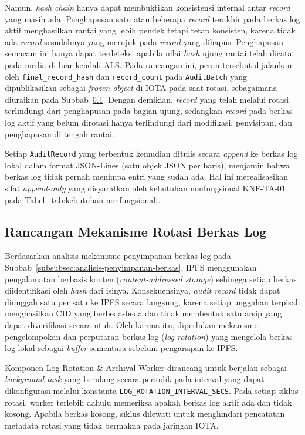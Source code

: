 Namun, \textit{hash chain} hanya dapat membuktikan konsistensi internal antar
\textit{record} yang masih ada. Penghapusan satu atau beberapa \textit{record}
terakhir pada berkas log aktif menghasilkan rantai yang lebih pendek tetapi
tetap konsisten, karena tidak ada \textit{record} sesudahnya yang merujuk pada
\textit{record} yang dihapus. Penghapusan semacam ini hanya dapat terdeteksi
apabila nilai \textit{hash} ujung rantai telah dicatat pada media di luar
kendali ALS. Pada rancangan ini, peran tersebut dijalankan oleh
\texttt{final\_record\_hash} dan \texttt{record\_count} pada \texttt{AuditBatch}
yang dipublikasikan sebagai \textit{frozen object} di IOTA pada saat rotasi,
sebagaimana diuraikan pada Subbab~\ref{subsec:rancangan-rotasi-log}. Dengan
demikian, \textit{record} yang telah melalui rotasi terlindungi dari
penghapusan pada bagian ujung, sedangkan \textit{record} pada berkas log aktif
yang belum dirotasi hanya terlindungi dari modifikasi, penyisipan, dan
penghapusan di tengah rantai.

Setiap \texttt{AuditRecord} yang terbentuk kemudian ditulis secara \textit{append} ke berkas log lokal dalam format JSON-Lines (satu objek JSON per baris), menjamin bahwa berkas log tidak pernah menimpa entri yang sudah ada. Hal ini merealisasikan sifat \textit{append-only} yang disyaratkan oleh kebutuhan nonfungsional KNF-TA-01 pada Tabel~\ref{tab:kebutuhan-nonfungsional}.

\subsection{Rancangan Mekanisme Rotasi Berkas Log}
\label{subsec:rancangan-rotasi-log}

Berdasarkan analisis mekanisme penyimpanan berkas log pada Subbab~\ref{subsubsec:analisis-penyimpanan-berkas}, IPFS menggunakan pengalamatan berbasis konten (\textit{content-addressed storage}) sehingga setiap berkas diidentifikasi oleh \textit{hash} dari isinya. Konsekuensinya, \textit{audit record} tidak dapat diunggah satu per satu ke IPFS secara langsung, karena setiap unggahan terpisah menghasilkan CID yang berbeda-beda dan tidak membentuk satu arsip yang dapat diverifikasi secara utuh. Oleh karena itu, diperlukan mekanisme pengelompokan dan perputaran berkas log (\textit{log rotation}) yang mengelola berkas log lokal sebagai \textit{buffer} sementara sebelum pengarsipan ke IPFS.

Komponen Log Rotation \& Archival Worker dirancang untuk berjalan sebagai \textit{background task} yang berulang secara periodik pada interval yang dapat dikonfigurasi melalui konstanta \texttt{LOG\_ROTATION\_INTERVAL\_SECS}. Pada setiap siklus rotasi, worker terlebih dahulu memeriksa apakah berkas log aktif ada dan tidak kosong. Apabila berkas kosong, siklus dilewati untuk menghindari pencatatan metadata rotasi yang tidak bermakna pada jaringan IOTA.

